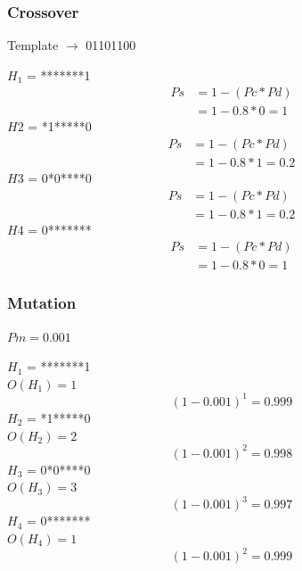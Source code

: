 \documentclass{article}
\begin{document}
\begin{enumerate}
        \subsubsection*{Crossover}
        Template $\rightarrow$ 01101100
        \begin{multicols}{2}
            $H_1$ = *******1
            \begin{align*}
                Ps &= 1 - (Pc * Pd)\\
                &= 1- 0.8 * 0 = 1
            \end{align*}
            $H2$ = *1*****0
            \begin{align*}
                Ps &= 1 - (Pc * Pd)\\
                &= 1- 0.8 * 1 = 0.2
            \end{align*}
            $H3$ = 0*0****0
            \begin{align*}
                Ps &= 1 - (Pc * Pd)\\
                &= 1- 0.8 * 1 = 0.2
            \end{align*}
            $H4$ = 0*******
            \begin{align*}
                Ps &= 1 - (Pc * Pd)\\
                &= 1- 0.8 * 0 = 1
            \end{align*}
        \end{multicols}

        \subsubsection*{Mutation}
        $Pm = 0.001$
        \begin{multicols}{2}
            $H_1$ = *******1\\
            $O(H_1) = 1$
            \begin{equation*}
                (1-0.001)^1 = 0.999
            \end{equation*}
            $H_2$ = *1*****0\\
            $O(H_2) = 2$
            \begin{equation*}
                (1-0.001)^2 = 0.998
            \end{equation*}
            $H_3$ = 0*0****0\\
            $O(H_3) = 3$
            \begin{equation*}
                (1-0.001)^3 = 0.997
            \end{equation*}
            $H_4$ = 0*******\\
            $O(H_4) = 1$
            \begin{equation*}
                (1-0.001)^2 = 0.999
            \end{equation*}
        \end{multicols}

\end{enumerate}
\end{document}
